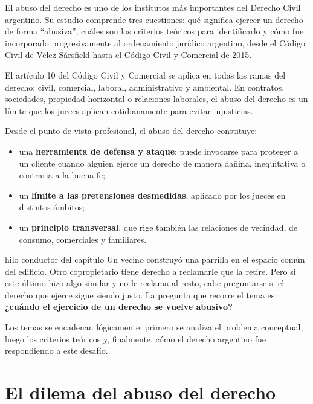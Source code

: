 \documentclass[12pt,oneside]{book}
\begin{document}
El abuso del derecho es uno de los institutos más importantes del Derecho Civil argentino. Su estudio comprende tres cuestiones: qué significa ejercer un derecho de forma ``abusiva'', cuáles son los criterios teóricos para identificarlo y cómo fue incorporado progresivamente al ordenamiento jurídico argentino, desde el Código Civil de Vélez Sársfield hasta el Código Civil y Comercial de 2015.

\begin{important}
El artículo 10 del Código Civil y Comercial se aplica en todas las ramas del derecho: civil, comercial, laboral, administrativo y ambiental. En contratos, sociedades, propiedad horizontal o relaciones laborales, el abuso del derecho es un límite que los jueces aplican cotidianamente para evitar injusticias.
\end{important}

Desde el punto de vista profesional, el abuso del derecho constituye:
\begin{itemize}
    \item una \textbf{herramienta de defensa y ataque}: puede invocarse para proteger a un cliente cuando alguien ejerce un derecho de manera dañina, inequitativa o contraria a la buena fe;
    \item un \textbf{límite a las pretensiones desmedidas}, aplicado por los jueces en distintos ámbitos;
    \item un \textbf{principio transversal}, que rige también las relaciones de vecindad, de consumo, comerciales y familiares.
\end{itemize}

\begin{example}{hilo conductor del capítulo}
Un vecino construyó una parrilla en el espacio común del edificio. Otro copropietario tiene derecho a reclamarle que la retire. Pero si este último hizo algo similar y no le reclama al resto, cabe preguntarse si el derecho que ejerce sigue siendo justo. La pregunta que recorre el tema es: \textbf{¿cuándo el ejercicio de un derecho se vuelve abusivo?}
\end{example}

Los temas se encadenan lógicamente: primero se analiza el problema conceptual, luego los criterios teóricos y, finalmente, cómo el derecho argentino fue respondiendo a este desafío.

\section{El dilema del abuso del derecho}
\end{document}
